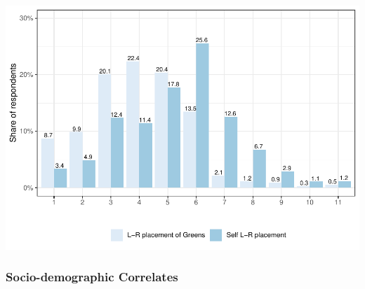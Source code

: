\documentclass[
]{article}
\begin{document}
\includegraphics{AVCD_Final_Assignment-Edenhofer_files/figure-latex/gruene-spatial-1.pdf}

\hypertarget{socio-demographic-correlates-1}{%
\subsubsection{Socio-demographic
Correlates}\label{socio-demographic-correlates-1}}
\end{document}

